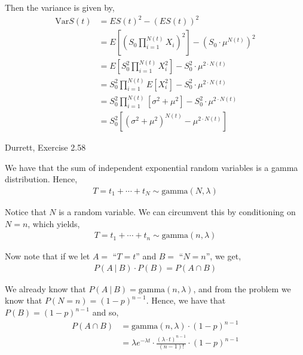 \documentclass[12pt]{article}
\newenvironment{problem}[2][Problem]{\begin{trivlist}
\item[\hskip \labelsep {\bfseries #1}\hskip \labelsep {\bfseries #2.}]}{\end{trivlist}}
\begin{document}
Then the variance is given by,
\begin{align*}
\text{Var}S(t) &= ES(t)^2 -(ES(t))^2\\
&= E \left[\left(S_0 \prod_{i = 1}^{N(t)} X_i \right)^2 \right] - (S_0 \cdot \mu^{N(t)})^2\\
&= E\left[S_0^2 \prod_{i = 1}^{N(t)} X_i^2 \right] - S_0^2 \cdot \mu^{2 \cdot N(t)}\\
&= S_0^2 \prod_{i = 1}^{N(t)} E \left[X_i^2 \right]  - S_0^2 \cdot \mu^{2 \cdot N(t)}\\
&= S_0^2 \prod_{i = 1}^{N(t)} \left[\sigma^2 + \mu^2 \right]  - S_0^2 \cdot \mu^{2 \cdot N(t)}\\
&= S_0^2 \left[ (\sigma^2 + \mu^2)^{N(t)} - \mu^{2 \cdot N(t)}\right]
\end{align*}

\newpage
\begin{problem}{4}
Durrett, Exercise 2.58
\end{problem}

We have that the sum of independent exponential random variables is a gamma distribution. Hence,
\begin{align*}
T = t_1 + \cdots + t_N \sim \text{gamma}(N, \lambda)
\end{align*}

Notice that $N$ is a random variable. We can circumvent this by conditioning on $N = n$, which yields,
\begin{align*}
T = t_1 + \cdots + t_n \sim \text{gamma}(n, \lambda)
\end{align*}

Now note that if we let $A =$ ``$T = t$'' and $B =$ ``$N = n$'', we get,
\begin{align*}
P(A \ | \ B) \cdot P(B) = P(A \cap B)
\end{align*}

We already know that $P(A \ | \ B) = \text{gamma}(n, \lambda)$, and from the problem we know that $P(N = n) = (1 - p)^{n-1}$. Hence, we have that $P(B) = (1 - p)^{n-1}$ and so,
\begin{align*} 
P(A \cap B) &= \text{gamma}(n, \lambda) \cdot (1 - p)^{n-1}\\
&= \lambda e^{-\lambda t} \cdot \frac{(\lambda \cdot t)^{n-1}}{(n-1)!} \cdot (1 - p)^{n-1}
\end{align*}
\end{document}
